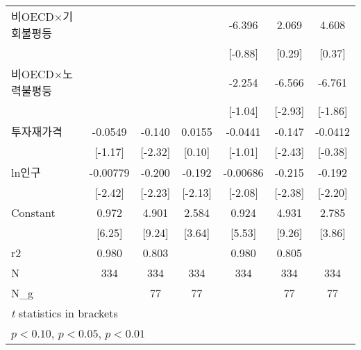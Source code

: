 \begin{table}[htbp]
\begin{tabular}{l*{6}{c}}
\addlinespace
비OECD$\times$기회불평등&                     &                     &                     &      -6.396         &       2.069         &       4.608         \\
                    &                     &                     &                     &     [-0.88]         &      [0.29]         &      [0.37]         \\
\addlinespace
비OECD$\times$노력불평등&                     &                     &                     &      -2.254         &      -6.566\sym{***}&      -6.761\sym{*}  \\
                    &                     &                     &                     &     [-1.04]         &     [-2.93]         &     [-1.86]         \\
\addlinespace
투자재가격        &     -0.0549         &      -0.140\sym{**} &      0.0155         &     -0.0441         &      -0.147\sym{**} &     -0.0412         \\
                    &     [-1.17]         &     [-2.32]         &      [0.10]         &     [-1.01]         &     [-2.43]         &     [-0.38]         \\
\addlinespace
ln인구            &    -0.00779\sym{**} &      -0.200\sym{**} &      -0.192\sym{**} &    -0.00686\sym{**} &      -0.215\sym{**} &      -0.192\sym{**} \\
                    &     [-2.42]         &     [-2.23]         &     [-2.13]         &     [-2.08]         &     [-2.38]         &     [-2.20]         \\
\addlinespace
Constant            &       0.972\sym{***}&       4.901\sym{***}&       2.584\sym{***}&       0.924\sym{***}&       4.931\sym{***}&       2.785\sym{***}\\
                    &      [6.25]         &      [9.24]         &      [3.64]         &      [5.53]         &      [9.26]         &      [3.86]         \\
\midrule
r2                  &       0.980         &       0.803         &                     &       0.980         &       0.805         &                     \\
N                   &         334         &         334         &         334         &         334         &         334         &         334         \\
N\_g                 &                     &          77         &          77         &                     &          77         &          77         \\
\bottomrule
\multicolumn{7}{l}{\footnotesize \textit{t} statistics in brackets}\\
\multicolumn{7}{l}{\footnotesize \sym{*} \(p<0.10\), \sym{**} \(p<0.05\), \sym{***} \(p<0.01\)}\\
\end{tabular}
\end{table}
